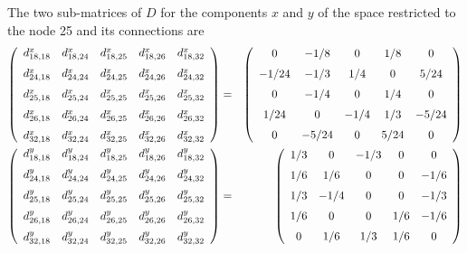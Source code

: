 \documentclass[11pt]{article}
\begin{document}
The two sub-matrices of $D$ for the components $x$ and $y$ of the
space restricted to the node 25 and its connections are
\begin{eqnarray}
\left(
\begin {array}{ccccc}
d^x_{18,18}&d^x_{18,24}&d^x_{18,25}&d^x_{18,26}&d^x_{18,32}\\
\noalign{\medskip}
d^x_{24,18}&d^x_{24,24}&d^x_{24,25}&d^x_{24,26}&d^x_{24,32}\\
\noalign{\medskip}
d^x_{25,18}&d^x_{25,24}&d^x_{25,25}&d^x_{25,26}&d^x_{25,32}\\
\noalign{\medskip}
d^x_{26,18}&d^x_{26,24}&d^x_{26,25}&d^x_{26,26}&d^x_{26,32}\\
\noalign{\medskip}
d^x_{32,18}&d^x_{32,24}&d^x_{32,25}&d^x_{32,26}&d^x_{32,32}\\
\end {array}
\right) 
& = & 
\left(
\begin {array}{ccccc}
0&-1/8&0&1/8&0\\
\noalign{\medskip}
-1/24&-1/3&1/4&0&5/24\\
\noalign{\medskip}
0&-1/4&0&1/4&0\\
\noalign{\medskip}
1/24&0&-1/4&1/3&-5/24\\
\noalign{\medskip}
0&-5/24&0&5/24&0\\
\end {array}
\right) 
\\ 
\left(
\begin {array}{ccccc}
d^y_{18,18}&d^y_{18,24}&d^y_{18,25}&d^y_{18,26}&d^y_{18,32}\\
\noalign{\medskip}
d^y_{24,18}&d^y_{24,24}&d^y_{24,25}&d^y_{24,26}&d^y_{24,32}\\
\noalign{\medskip}
d^y_{25,18}&d^y_{25,24}&d^y_{25,25}&d^y_{25,26}&d^y_{25,32}\\
\noalign{\medskip}
d^y_{26,18}&d^y_{26,24}&d^y_{26,25}&d^y_{26,26}&d^y_{26,32}\\
\noalign{\medskip}
d^y_{32,18}&d^y_{32,24}&d^y_{32,25}&d^y_{32,26}&d^y_{32,32}\\
\end {array}
\right) 
& = & 
\left(
\begin {array}{ccccc}
1/3&0&-1/3&0&0\\
\noalign{\medskip}
1/6&1/6&0&0&-1/6\\
\noalign{\medskip}
1/3&-1/4&0&0&-1/3\\
\noalign{\medskip}
1/6&0&0&1/6&-1/6\\
\noalign{\medskip}
0&1/6&1/3&1/6&0\\
\end {array}
\right) 
\end{eqnarray} 
\end{document}
